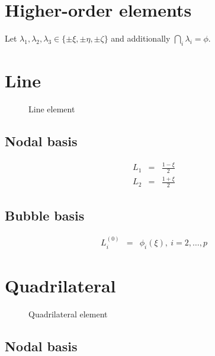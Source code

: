 \section{Higher-order elements}

\label{app:pbasis}

Let $\lambda_1,\lambda_2,\lambda_3 \in \{\pm\xi,\pm\eta,\pm\zeta \}$
and additionally $\bigcap_i\lambda_i=\phi$. 

\section{Line}

\begin{figure}[tbhp]
\begin{center}

\caption{Line element}
\end{center}
\end{figure}

\subsection{Nodal basis}

\begin{eqnarray*}
L_1&=&\frac{1-\xi}{2} \\
L_2&=&\frac{1+\xi}{2}
\end{eqnarray*}

\subsection{Bubble basis}

\begin{eqnarray*}
L_i^{(0)}&=&\phi_i(\xi),\ i=2,\ldots,p
\end{eqnarray*}

\section{Quadrilateral}

\begin{figure}[tbhp]
\begin{center}

\caption{Quadrilateral element}
\end{center}
\end{figure}

\subsection{Nodal basis}

